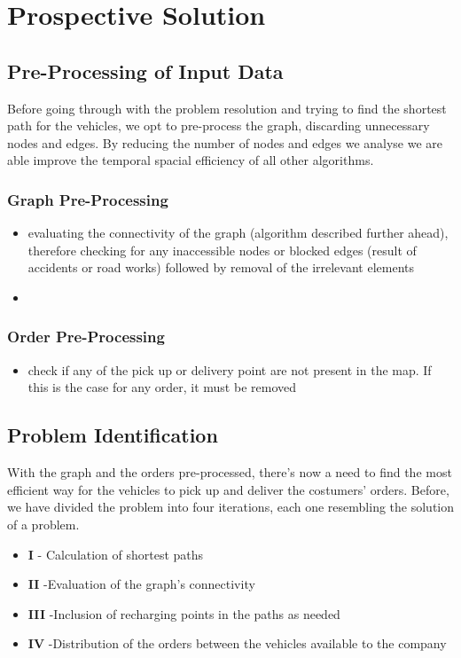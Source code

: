 \chapter{Prospective Solution}

\section{Pre-Processing of Input Data}
Before going through with the problem resolution and trying to find the shortest path for the vehicles, we opt to pre-process the graph, discarding unnecessary nodes and edges. By reducing the number of nodes and edges we analyse we are able improve the temporal spacial efficiency of all other algorithms. 

\subsection{Graph Pre-Processing}
\begin{itemize}
    \item evaluating the connectivity of the graph (algorithm described further ahead), therefore checking for any inaccessible nodes or blocked edges (result of accidents or road works) followed by removal of the irrelevant elements
    \item 
\end{itemize}

\subsection{Order Pre-Processing}
\begin{itemize}
    \item check if any of the pick up or delivery point are not present in the map. If this is the case for any order, it must be removed
\end{itemize}


\section{Problem Identification}

With the graph and the orders pre-processed, there's now a need to find the most efficient way for the vehicles to pick up and deliver the costumers' orders. Before, we have divided the problem into four iterations, each one resembling the solution of a problem. 
\begin{itemize}
    \item \textbf{I} - Calculation of shortest paths
    \item \textbf{II} -Evaluation of the graph's connectivity
    \item \textbf{III} -Inclusion of recharging points in the paths as needed
    \item \textbf{IV} -Distribution of the orders between the vehicles available to the company
\end{itemize}


